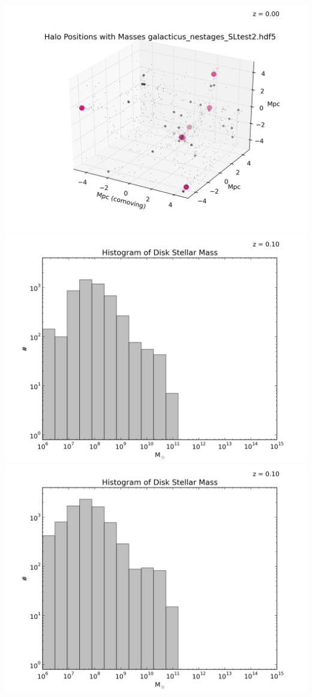 \begin{itemize}
\includegraphics[scale=0.75]{analysis/galacticus/positionPlotsMasses/Halo_Positions_with_Masses_galacticus_nestages_SLtest2_5Mpc_0003.png} \\
\includegraphics[scale=0.5]{analysis/galacticus/histograms/Histogram_of_Disk_Stellar_Massgalacticus_nestages12_0000.png} \\
\includegraphics[scale=0.5]{analysis/galacticus/histograms/Histogram_of_Disk_Stellar_Massgalacticus_nestages12SLtest_0000.png} \\

\end{itemize}
